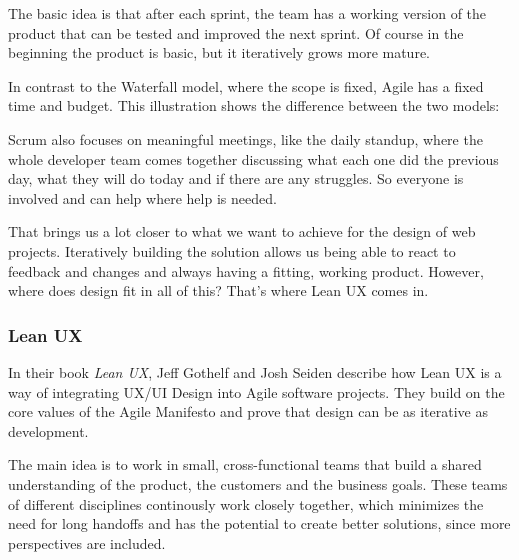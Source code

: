 The basic idea is that after each sprint, the team has a working version of the product that can be
tested and improved the next sprint. Of course in the beginning the product is basic, but it
iteratively grows more mature. 

In contrast to the Waterfall model, where the scope is fixed, Agile has a fixed time and budget.
This illustration shows the difference between the two models:

Scrum also focuses on meaningful meetings, like the daily standup, where the whole developer team
comes together discussing what each one did the previous day, what they will do today and if there
are any struggles. So everyone is involved and can help where help is needed.


That brings us a lot closer to what we want to achieve for the design of web projects. Iteratively
building the solution allows us being able to react to feedback and changes and always having a
fitting, working product. However, where does design fit in all of this? That's where Lean UX comes
in.

\subsubsection{Lean UX}

In their book \textit{Lean UX}, Jeff Gothelf and Josh Seiden describe how Lean UX is a way of
integrating UX/UI Design into Agile software projects. They build on the core values of the Agile
Manifesto and prove that design can be as iterative as development.  

The main idea is to work in small, cross-functional teams that build a shared understanding of the
product, the customers and the business goals. These teams of different disciplines continously work
closely together, which minimizes the need for long handoffs and has the potential to create better
solutions, since more perspectives are included. 

